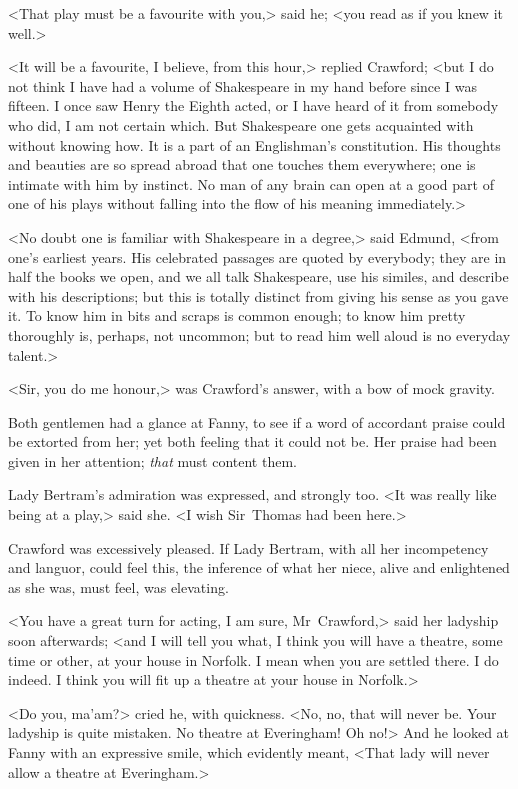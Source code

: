 <That play must be a favourite with you,> said he; <you read as if you knew it well.>

<It will be a favourite, I believe, from this hour,> replied Crawford; <but I do not think I have had a volume of Shakespeare in my hand before since I was fifteen. I once saw Henry the Eighth acted, or I have heard of it from somebody who did, I am not certain which. But Shakespeare one gets acquainted with without knowing how. It is a part of an Englishman's constitution. His thoughts and beauties are so spread abroad that one touches them everywhere; one is intimate with him by instinct. No man of any brain can open at a good part of one of his plays without falling into the flow of his meaning immediately.>

<No doubt one is familiar with Shakespeare in a degree,> said Edmund, <from one's earliest years. His celebrated passages are quoted by everybody; they are in half the books we open, and we all talk Shakespeare, use his similes, and describe with his descriptions; but this is totally distinct from giving his sense as you gave it. To know him in bits and scraps is common enough; to know him pretty thoroughly is, perhaps, not uncommon; but to read him well aloud is no everyday talent.>

<Sir, you do me honour,> was Crawford's answer, with a bow of mock gravity.

Both gentlemen had a glance at Fanny, to see if a word of accordant praise could be extorted from her; yet both feeling that it could not be. Her praise had been given in her attention; \textit{that}  must content them.

Lady Bertram's admiration was expressed, and strongly too. <It was really like being at a play,> said she. <I wish Sir~Thomas had been here.>

Crawford was excessively pleased. If Lady Bertram, with all her incompetency and languor, could feel this, the inference of what her niece, alive and enlightened as she was, must feel, was elevating.

<You have a great turn for acting, I am sure, Mr~Crawford,> said her ladyship soon afterwards; <and I will tell you what, I think you will have a theatre, some time or other, at your house in Norfolk. I mean when you are settled there. I do indeed. I think you will fit up a theatre at your house in Norfolk.>

<Do you, ma'am?> cried he, with quickness. <No, no, that will never be. Your ladyship is quite mistaken. No theatre at Everingham! Oh no!> And he looked at Fanny with an expressive smile, which evidently meant, <That lady will never allow a theatre at Everingham.>

